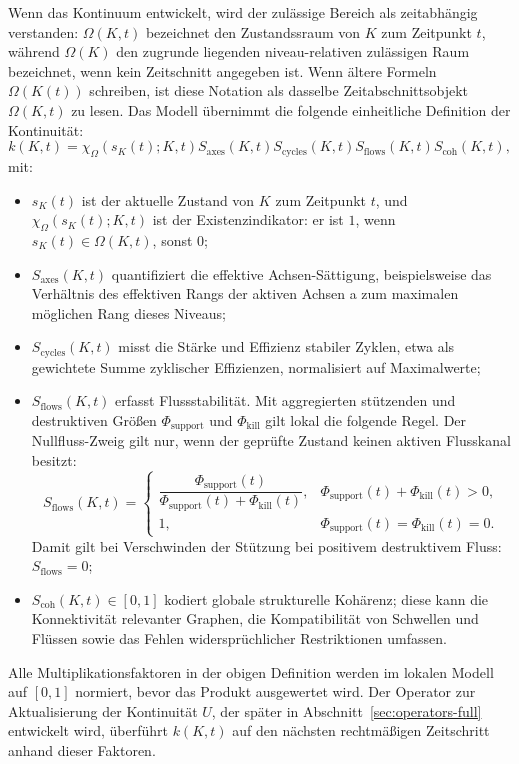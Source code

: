 Wenn das Kontinuum entwickelt, wird der zulässige Bereich als zeitabhängig
verstanden:
\(\Omega(K,t)\) bezeichnet den Zustandssraum von \(K\) zum Zeitpunkt
\(t\), während \(\Omega(K)\) den zugrunde liegenden
niveau-relativen zulässigen Raum bezeichnet, wenn kein Zeitschnitt angegeben ist.
Wenn ältere Formeln \(\Omega(K(t))\) schreiben, ist diese Notation als dasselbe
Zeitabschnittsobjekt \(\Omega(K,t)\) zu lesen.
Das Modell übernimmt die folgende einheitliche Definition der Kontinuität:
\[
    k(K,t)
    = \chi_{\Omega}(s_K(t);K,t)
      S_{\mathrm{axes}}(K,t)
      S_{\mathrm{cycles}}(K,t)
      S_{\mathrm{flows}}(K,t)
      S_{\mathrm{coh}}(K,t),
\]
mit:
\begin{itemize}
    \item \(s_K(t)\) ist der aktuelle Zustand von \(K\) zum Zeitpunkt \(t\),
          und \(\chi_{\Omega}(s_K(t);K,t)\) ist der Existenzindikator:
          er ist \(1\), wenn \(s_K(t)\in\Omega(K,t)\), sonst \(0\);
    \item \(S_{\mathrm{axes}}(K,t)\) quantifiziert die effektive Achsen-Sättigung,
          beispielsweise das Verhältnis des effektiven Rangs der aktiven Achsen
a zum maximalen möglichen Rang dieses Niveaus;
    \item \(S_{\mathrm{cycles}}(K,t)\) misst die Stärke und Effizienz stabiler
          Zyklen, etwa als gewichtete Summe zyklischer Effizienzen,
          normalisiert auf Maximalwerte;
    \item \(S_{\mathrm{flows}}(K,t)\) erfasst Flussstabilität. Mit aggregierten
          stützenden und destruktiven Größen \(\Phi_{\mathrm{support}}\) und
          \(\Phi_{\mathrm{kill}}\) gilt lokal die folgende Regel. Der
          Nullfluss-Zweig gilt nur, wenn der geprüfte Zustand keinen aktiven
          Flusskanal besitzt:
          \[
              S_{\mathrm{flows}}(K,t)=
              \begin{cases}
              \dfrac{\Phi_{\mathrm{support}}(t)}
                    {\Phi_{\mathrm{support}}(t)+\Phi_{\mathrm{kill}}(t)},
                    & \Phi_{\mathrm{support}}(t)+\Phi_{\mathrm{kill}}(t)>0,\\[0.7em]
              1, & \Phi_{\mathrm{support}}(t)=\Phi_{\mathrm{kill}}(t)=0.
              \end{cases}
          \]
          Damit gilt bei Verschwinden der Stützung bei positivem destruktivem Fluss:
          \(S_{\mathrm{flows}}=0\);
    \item \(S_{\mathrm{coh}}(K,t)\in[0,1]\) kodiert globale
          strukturelle Kohärenz; diese kann die Konnektivität relevanter Graphen,
          die Kompatibilität von Schwellen und Flüssen sowie das Fehlen
          widersprüchlicher Restriktionen umfassen.
\end{itemize}
Alle Multiplikationsfaktoren in der obigen Definition werden im lokalen Modell auf
\([0,1]\) normiert, bevor das Produkt ausgewertet wird.
Der Operator zur Aktualisierung der Kontinuität \(U\), der später in
Abschnitt~\ref{sec:operators-full} entwickelt wird, überführt \(k(K,t)\) auf
den nächsten rechtmäßigen Zeitschritt anhand dieser Faktoren.

